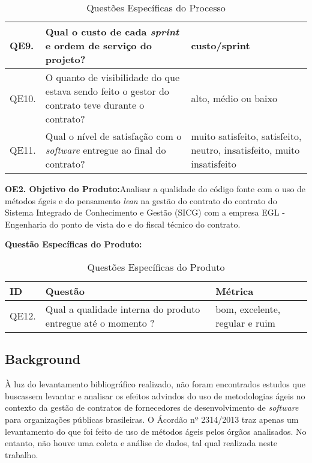 \begin{table}[H]
\begin{tabular}{|p{0.8cm}|p{7.0cm}|p{6.0cm}|}
QE9.        & Qual o custo de cada \textit{sprint} e ordem de serviço do projeto?                                                                                       &  custo/sprint               \\ \hline
QE10.        & O quanto de visibilidade do que estava sendo feito o gestor do contrato teve durante o contrato?                                      &  alto, médio ou baixo              \\ \hline
QE11.        & Qual o nível de satisfação com o \textit{software} entregue ao final do contrato?                         &   muito satisfeito, satisfeito, neutro, insatisfeito, muito insatisfeito             \\ \hline
\end{tabular}
\caption{Questões Específicas do Processo}
		\label{qespec}
\end{table}


\textbf{OE2. Objetivo do Produto:}Analisar a qualidade do código fonte com o uso de métodos ágeis e do pensamento \textit{lean} na gestão do contrato do contrato do Sistema Integrado 
de Conhecimento e Gestão (SICG) com a empresa EGL - Engenharia do ponto de vista do  e do fiscal técnico do contrato.

\textbf{Questão Específicas do Produto:}

\begin{table}[H]
\footnotesize
\center
\begin{tabular}{|p{0.8cm}|p{8.0cm}|p{5.0cm}|}
\hline
\textbf{ID} & \textbf{Questão}                                                                                                                                  & \textbf{Métrica}    \\ \hline
QE12.        &  Qual a qualidade interna do produto entregue até o momento ?                                                                            &  bom, excelente, regular e ruim       \\ \hline
\end{tabular}
\caption{Questões Específicas do Produto}
		\label{qespecprod}
\end{table}



\subsection[Background]{Background}

À luz do levantamento bibliográfico realizado, não foram encontrados estudos que buscassem levantar e analisar os efeitos advindos do uso de metodologias ágeis no contexto da gestão de contratos de fornecedores de desenvolvimento de \textit{software} para organizações públicas brasileiras. O Ácordão nº 2314/2013 traz apenas um levantamento do que foi feito de uso de métodos ágeis pelos órgãos analisados. No entanto, não houve uma coleta e análise de dados, tal qual realizada neste trabalho.

